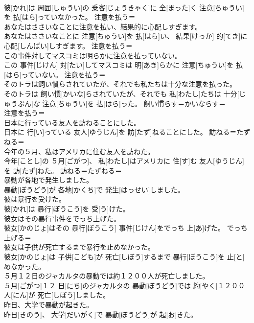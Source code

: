 \documentclass[8pt]{extreport}
\begin{document}
\begin{CJK}{UTF8}{min}
\\	彼[かれ]は 周囲[しゅうい]の 乗客[じょうきゃく]に 全[まった]く 注意[ちゅうい]を 払[はら]っていなかった。	注意を払う＝ 
\\	あなたはささいなことに注意を払い、結果的に心配しすぎます。	
\\	あなたはささいなことに 注意[ちゅうい]を 払[はら]い、 結果[けっか] 的[てき]に 心配[しんぱい]しすぎます。	注意を払う＝ 
\\	この事件対してマスコミは明らかに注意を払っていない。	
\\	この 事件[じけん] 対[たい]してマスコミは 明[あき]らかに 注意[ちゅうい]を 払[はら]っていない。	注意を払う＝ 
\\	そのトラは飼い慣らされていたが、それでも私たちは十分な注意を払った。	
\\	そのトラは 飼い慣[かいな]らされていたが、それでも 私[わたし]たちは 十分[じゅうぶん]な 注意[ちゅうい]を 払[はら]った。	飼い慣らす＝かいならす＝ 
\\	注意を払う＝ 
\\	日本に行っている友人を訪ねることにした。	
\\	日本に 行[い]っている 友人[ゆうじん]を 訪[たず]ねることにした。	訪ねる＝たずねる＝ 
\\	今年の５月、私はアメリカに住む友人を訪ねた。	
\\	今年[ことし]の ５月[ごがつ]、 私[わたし]はアメリカに 住[す]む 友人[ゆうじん]を 訪[たず]ねた。	訪ねる＝たずねる＝ 
\\	暴動が各地で発生しました。	
\\	暴動[ぼうどう]が 各地[かくち]で 発生[はっせい]しました。	
\\	彼は暴行を受けた。	
\\	彼[かれ]は 暴行[ぼうこう]を 受[う]けた。	
\\	彼女はその暴行事件をでっち上げた。	
\\	彼女[かのじょ]はその 暴行[ぼうこう] 事件[じけん]をでっち 上[あ]げた。	でっち上げる＝ 
\\	彼女は子供が死亡するまで暴行を止めなかった。	
\\	彼女[かのじょ]は 子供[こども]が 死亡[しぼう]するまで 暴行[ぼうこう]を 止[と]めなかった。	
\\	５月１２日のジャカルタの暴動では約１２００人が死亡しました。	
\\	５月[ごがつ]１２ 日[にち]のジャカルタの 暴動[ぼうどう]では 約[やく]１２００ 人[にん]が 死亡[しぼう]しました。	
\\	昨日、大学で暴動が起きた。	
\\	昨日[きのう]、 大学[だいがく]で 暴動[ぼうどう]が 起[お]きた。	

\end{CJK}
\end{document}
